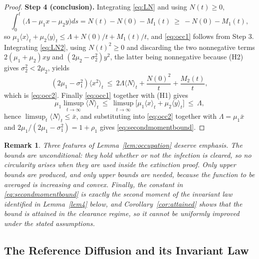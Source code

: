 \documentclass{article}
\newtheorem{remark}{Remark}[section]
\newcommand{\avg}[1]{\big\langle #1 \big\rangle_t}
\begin{document}
\begin{proof}
\textbf{Step 4 (conclusion).} Integrating \eqref{eq:LN} and using $N(t)\ge0$,
\[
\int_0^t\big(\Lambda-\mu_1x-\mu_2y\big)ds=N(t)-N(0)-M_1(t)\ \ge\ -N(0)-M_1(t),
\]
so $\mu_1\avg{x}+\mu_2\avg{y}\le\Lambda+N(0)/t+M_1(t)/t$, and \eqref{eq:occ1} follows from Step 3. Integrating \eqref{eq:LN2}, using $N(t)^2\ge0$ and discarding the two nonnegative terms $2(\mu_1+\mu_2)xy$ and $(2\mu_2-\sigma_2^2)y^2$, the latter being nonnegative because (H2) gives $\sigma_2^2<2\mu_2$, yields
\[
(2\mu_1-\sigma_1^2)\avg{x^2}\ \le\ 2\Lambda\avg{N}+\frac{N(0)^2}{t}+\frac{M_2(t)}{t},
\]
which is \eqref{eq:occ2}. Finally \eqref{eq:occ1} together with (H1) gives
\[
\mu_1\limsup_{t\to\infty}\avg{N}\ \le\ \limsup_{t\to\infty}\big[\mu_1\avg{x}+\mu_2\avg{y}\big]\ \le\ \Lambda,
\]
hence $\limsup_t\avg{N}\le\bar x$, and substituting into \eqref{eq:occ2} together with $\Lambda=\mu_1\bar x$ and $2\mu_1/(2\mu_1-\sigma_1^2)=1+\rho_1$ gives \eqref{eq:secondmomentbound}.
\end{proof}

\begin{remark}\label{rem:occupation}
Three features of Lemma~\ref{lem:occupation} deserve emphasis. The bounds are unconditional: they hold whether or not the infection is cleared, so no circularity arises when they are used inside the extinction proof. Only upper bounds are produced, and only upper bounds are needed, because the function to be averaged is increasing and convex. Finally, the constant in \eqref{eq:secondmomentbound} is exactly the second moment of the invariant law identified in Lemma~\ref{lem4} below, and Corollary~\ref{cor:attained} shows that the bound is attained in the clearance regime, so it cannot be uniformly improved under the stated assumptions.
\end{remark}

\subsection{The Reference Diffusion and its Invariant Law}
\end{document}

